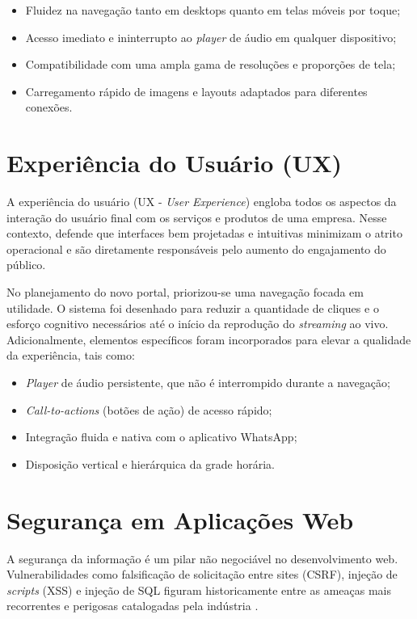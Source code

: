 \documentclass[12pt, openright, oneside, a4paper, brazil]{ads-unipac-abntex2}
\begin{document}
\begin{itemize}
    \item Fluidez na navegação tanto em desktops quanto em telas móveis por toque;
    \item Acesso imediato e ininterrupto ao \textit{player} de áudio em qualquer dispositivo;
    \item Compatibilidade com uma ampla gama de resoluções e proporções de tela;
    \item Carregamento rápido de imagens e layouts adaptados para diferentes conexões.
\end{itemize}

\section{Experiência do Usuário (UX)}

A experiência do usuário (UX - \textit{User Experience}) engloba todos os aspectos da interação do usuário final com os serviços e produtos de uma empresa. Nesse contexto,  defende que interfaces bem projetadas e intuitivas minimizam o atrito operacional e são diretamente responsáveis pelo aumento do engajamento do público.

No planejamento do novo portal, priorizou-se uma navegação focada em utilidade. O sistema foi desenhado para reduzir a quantidade de cliques e o esforço cognitivo necessários até o início da reprodução do \textit{streaming} ao vivo. Adicionalmente, elementos específicos foram incorporados para elevar a qualidade da experiência, tais como:

\begin{itemize}
    \item \textit{Player} de áudio persistente, que não é interrompido durante a navegação;
    \item \textit{Call-to-actions} (botões de ação) de acesso rápido;
    \item Integração fluida e nativa com o aplicativo WhatsApp;
    \item Disposição vertical e hierárquica da grade horária.
\end{itemize}

\section{Segurança em Aplicações Web}

A segurança da informação é um pilar não negociável no desenvolvimento web. Vulnerabilidades como falsificação de solicitação entre sites (CSRF), injeção de \textit{scripts} (XSS) e injeção de SQL figuram historicamente entre as ameaças mais recorrentes e perigosas catalogadas pela indústria \cite{owasp}.
\end{document}
